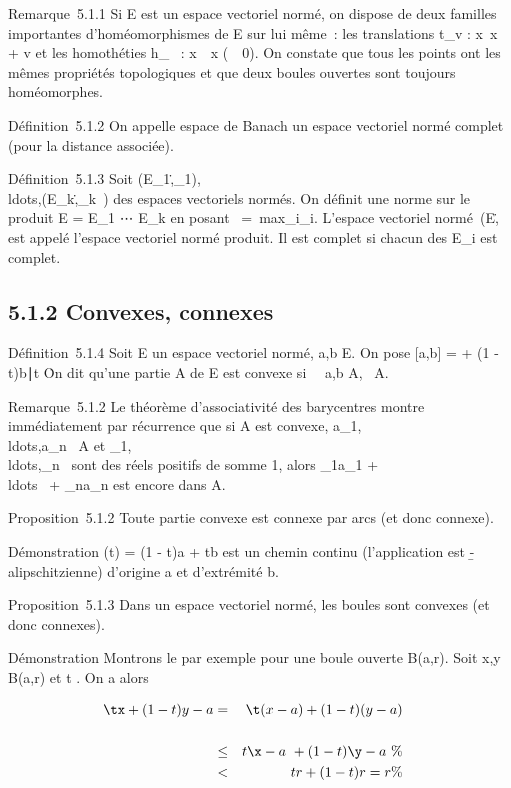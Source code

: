 \documentclass[]{article}
\begin{document}
Remarque~5.1.1 Si E est un espace vectoriel normé, on dispose de deux
familles importantes d'homéomorphismes de E sur lui même~: les
translations t_v : x\mapsto~x + v et les
homothéties h_\lambda~ : x\mapsto~\lambda~x
(\lambda~\neq~0). On constate que tous les points ont
les mêmes propriétés topologiques et que deux boules ouvertes sont
toujours homéomorphes.

Définition~5.1.2 On appelle espace de Banach un espace vectoriel normé
complet (pour la distance associée).

Définition~5.1.3 Soit
(E_1,\._1),\\ldots,(E_k,\._k~)
des espaces vectoriels normés. On définit une norme sur le produit E =
E_1 \times⋯ \times E_k en posant
\x\
=\
max\x_i_i.
L'espace vectoriel
normé~(E,\.\) est
appelé l'espace vectoriel normé produit. Il est complet si chacun des
E_i est complet.

\subsection{5.1.2 Convexes, connexes}

Définition~5.1.4 Soit E un espace vectoriel normé, a,b \in E. On pose
[a,b] = \ta + (1 - t)b∣t
\in [0,1]\. On dit qu'une partie A de E est convexe
si \forall~~a,b \in A,\quad [a,b] \subset~
A.

Remarque~5.1.2 Le théorème d'associativité des barycentres montre
immédiatement par récurrence que si A est convexe,
a_1,\\ldots,a_n~
\in A et
\lambda_1,\\ldots,\lambda_n~
sont des réels positifs de somme 1, alors \lambda_1a_1 +
\\ldots~ +
\lambda_na_n est encore dans A.

Proposition~5.1.2 Toute partie convexe est connexe par arcs (et donc
connexe).

Démonstration \gamma(t) = (1 - t)a + tb est un chemin continu (l'application
est \b -
a\-lipschitzienne) d'origine a et d'extrémité
b.

Proposition~5.1.3 Dans un espace vectoriel normé, les boules sont
convexes (et donc connexes).

Démonstration Montrons le par exemple pour une boule ouverte B(a,r).
Soit x,y \in B(a,r) et t \in [0,1]. On a alors

\begin{align*} \tx + (1 -
t)y - a& =& \t(x -
a) + (1 - t)(y - a)\\%
\\ & \leq& t\x -
a\ + (1 - t)\y -
a\ \%& \\ &
<& tr + (1 - t)r = r \%& \\
\end{align*}
\end{document}
